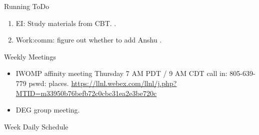 \begin{frame}
\begin{columns}
\begin{column}{0.5\linewidth}
\begin{block}{Running ToDo}
\begin{enumerate}
        \item \tiny EI: Study materials from CBT.   .
        \item \tiny Work:comm: figure out whether to add Anshu .     
    \end{enumerate}
      \end{block}
      

      \begin{block}{Weekly Meetings}
        \begin{itemize}
          \tiny \item \tiny IWOMP affinity meeting Thursday 7 AM PDT / 9 AM
          CDT call in: 805-639-779 pswd: places. \url{https://llnl.webex.com/llnl/j.php?MTID=m33950b76befb72c0cbc31ea2e3be720c}
        \item \tiny DEG group meeting.  
        \end{itemize}
      \end{block} 
     
      \begin{block}{Week Daily Schedule}
        

\end{block}
\end{column}
\end{columns}
\end{frame}
